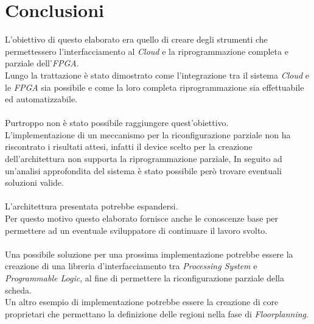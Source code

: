 \chapter{Conclusioni}
\label{chap:conclusioni}
L'obiettivo di questo elaborato era quello di creare degli strumenti che permettessero l'interfacciamento al \textit{Cloud} e la riprogrammazione completa e parziale dell'\textit{FPGA}.\\
Lungo la trattazione è stato dimostrato come l'integrazione tra il sistema \textit{Cloud} e le \textit{FPGA} sia possibile e come la loro completa riprogrammazione sia effettuabile ed automatizzabile.\\
\\
Purtroppo non è stato possibile raggiungere quest'obiettivo.\\ L'implementazione di un meccanismo per la riconfigurazione parziale non ha riscontrato i risultati attesi, infatti il device scelto per la creazione dell'architettura non supporta la riprogrammazione parziale, In seguito ad un'analisi approfondita del sistema è stato possibile però trovare eventuali soluzioni valide.\\
\\
L'architettura presentata potrebbe espandersi.\\
Per questo motivo questo elaborato fornisce anche le conoscenze base per permettere ad un eventuale sviluppatore di continuare il lavoro svolto.\\
\\
Una possibile soluzione per una prossima implementazione potrebbe essere la creazione di una libreria d'interfacciamento tra \textit{Processing System} e \textit{Programmable Logic}, al fine di permettere la riconfigurazione parziale della scheda.\\
Un altro esempio di  implementazione potrebbe essere la creazione di core proprietari che permettano la definizione delle regioni nella fase di \textit{Floorplanning}.
